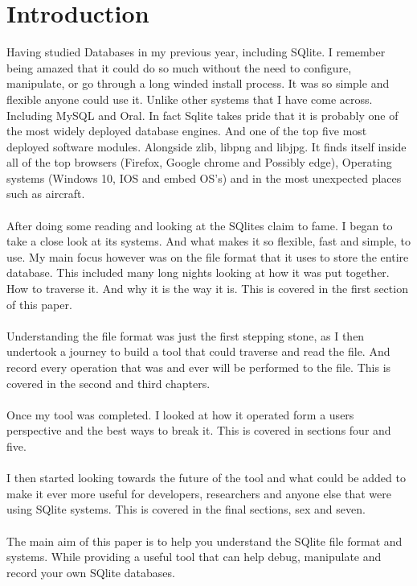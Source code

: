 \section*{Introduction}
\label{sec:introduction}

Having studied Databases in my previous year, including SQlite. I remember being amazed that it could do so much without the need to configure, manipulate, or go through a long winded install process. It was so simple and flexible anyone could use it. Unlike other systems that I have come across. Including MySQL and Oral. In fact Sqlite takes pride that it is probably one of the most widely deployed database engines. And one of the top five most deployed software modules. Alongside zlib, libpng and libjpg. It finds itself inside all of the top browsers (Firefox, Google chrome and Possibly edge), Operating systems (Windows 10, IOS and embed OS's) and in the most unexpected places such as aircraft.
\\\\
After doing some reading and looking at the SQlites claim to fame. I began to take a close look at its systems. And what makes it so flexible, fast and simple, to use. My main focus however was on the file format that it uses to store the entire database. This included many long nights looking at how it was put together. How to traverse it. And why it is the way it is. This is covered in the first section of this paper.
\\\\
Understanding the file format was just the first stepping stone, as I then undertook a journey to build a tool that could traverse and read the file. And record every operation that was and ever will be performed to the file. This is covered in the second and third chapters.
\\\\
Once my tool was completed. I looked at how it operated form a users perspective and the best ways to break it. This is covered in sections four and five. 
\\\\
I then started looking towards the future of the tool and what could be added to make it ever more useful for developers, researchers and anyone else that were using SQlite systems. This is covered in the final sections, sex and seven.
\\\\
The main aim of this paper is to help you understand the SQlite file format and systems. While providing a useful tool that can help debug, manipulate and record your own SQlite databases.